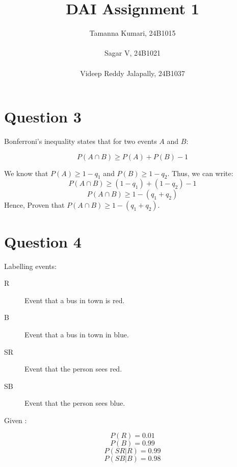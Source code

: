 \documentclass{report}
\title{\Huge DAI Assignment 1}
\author{Tamanna Kumari, 24B1015
\\\\Sagar V, 24B1021
\\\\Videep Reddy Jalapally, 24B1037}
\date{}
\begin{document}
\maketitle

\newpage

\section*{Question 3}

Bonferroni's inequality states that for two events \( A \) and \( B \):

\[P(A \cap B) \geq P(A) + P(B) - 1 \]

We know that \( P(A) \geq 1 - q_1 \) and \( P(B) \geq 1 - q_2\).
Thus, we can write:
\[P(A \cap B) \geq (1 - q_1) + (1 - q_2) - 1\]
\[P(A \cap B) \geq 1 - (q_1 + q_2)\]
 Hence, Proven that \( P(A \cap B) \geq 1 - (q_1 + q_2) \).

\section*{Question 4}

Labelling events: \\
 \begin{description}
\item[R]Event that a bus in town is red.
\item[B] Event that a bus in town in blue.
\item[SR] Event that the person sees red.
\item[SB] Event that the person sees blue.  
 \end{description}

Given : 

\[P(R) = 0.01\] 
\[P(B) = 0.99\] 
\[P(SR | R) = 0.99\]
\[P (SB | B) = 0.98\]
\end{document}
